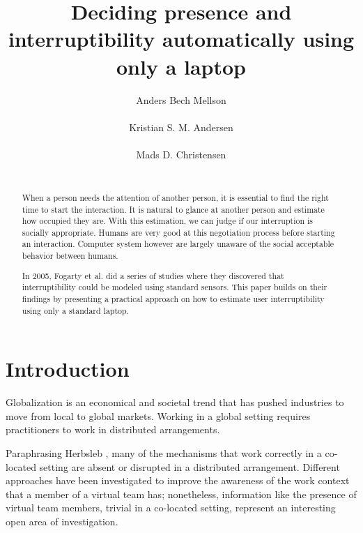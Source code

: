 \documentclass{sigchi}
\begin{document}
\title{Deciding presence and interruptibility automatically using only a laptop}
\author{
  \alignauthor Anders Bech Mellson\\
    \\
  \alignauthor Kristian S. M. Andersen\\
    \\
  \alignauthor Mads D. Christensen\\
    \\
}

\maketitle

\begin{abstract}
When a person needs the attention of another person, it is essential to find the right time to start the interaction.
It is natural to glance at another person and estimate how occupied they are. With this estimation, we can judge if our interruption is socially appropriate.
Humans are very good at this negotiation process before starting an interaction.
Computer system however are largely unaware of the social acceptable behavior between humans.

In 2005, Fogarty et al. did a series of studies where they discovered that interruptibility could be modeled using standard sensors.
This paper builds on their findings by presenting a practical approach on how to estimate user interruptibility using only a standard laptop.

\end{abstract}



\section{Introduction}
Globalization is an economical and societal trend that has pushed industries to move from local to global markets.
Working in a global setting requires practitioners to work in distributed arrangements.

Paraphrasing Herbsleb \cite{herbsleb2007}, many of the mechanisms that work correctly in a co-located setting are absent or disrupted in a distributed arrangement.
Different approaches \cite{bly1993media} \cite{fogarty2004myvine} \cite{hincapie2011design} \cite{lai2003myteam} \cite{want1992active} have been investigated to improve the awareness of the work context that a member of a virtual team has; nonetheless, information like the presence of virtual team members, trivial in a co-located setting, represent an interesting open area of investigation.
\end{document}
